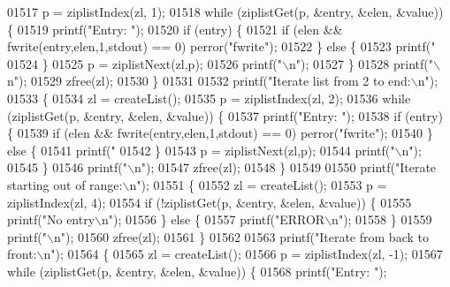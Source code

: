 \begin{DoxyCode}
{{{{{{{{{{{{{{{{{{{{{{{01517         p = ziplistIndex(zl, 1);
01518         \textcolor{keywordflow}{while} (ziplistGet(p, &entry, &elen, &value)) \{
01519             printf(\textcolor{stringliteral}{"Entry: "});
01520             \textcolor{keywordflow}{if} (entry) \{
01521                 \textcolor{keywordflow}{if} (elen && fwrite(entry,elen,1,stdout) == 0) perror(\textcolor{stringliteral}{"fwrite"});
01522             \} \textcolor{keywordflow}{else} \{
01523                 printf(\textcolor{stringliteral}{"%
01524             \}
01525             p = ziplistNext(zl,p);
01526             printf(\textcolor{stringliteral}{"\(\backslash\)n"});
01527         \}
01528         printf(\textcolor{stringliteral}{"\(\backslash\)n"});
01529         zfree(zl);
01530     \}
01531 
01532     printf(\textcolor{stringliteral}{"Iterate list from 2 to end:\(\backslash\)n"});
01533     \{
01534         zl = createList();
01535         p = ziplistIndex(zl, 2);
01536         \textcolor{keywordflow}{while} (ziplistGet(p, &entry, &elen, &value)) \{
01537             printf(\textcolor{stringliteral}{"Entry: "});
01538             \textcolor{keywordflow}{if} (entry) \{
01539                 \textcolor{keywordflow}{if} (elen && fwrite(entry,elen,1,stdout) == 0) perror(\textcolor{stringliteral}{"fwrite"});
01540             \} \textcolor{keywordflow}{else} \{
01541                 printf(\textcolor{stringliteral}{"%
01542             \}
01543             p = ziplistNext(zl,p);
01544             printf(\textcolor{stringliteral}{"\(\backslash\)n"});
01545         \}
01546         printf(\textcolor{stringliteral}{"\(\backslash\)n"});
01547         zfree(zl);
01548     \}
01549 
01550     printf(\textcolor{stringliteral}{"Iterate starting out of range:\(\backslash\)n"});
01551     \{
01552         zl = createList();
01553         p = ziplistIndex(zl, 4);
01554         \textcolor{keywordflow}{if} (!ziplistGet(p, &entry, &elen, &value)) \{
01555             printf(\textcolor{stringliteral}{"No entry\(\backslash\)n"});
01556         \} \textcolor{keywordflow}{else} \{
01557             printf(\textcolor{stringliteral}{"ERROR\(\backslash\)n"});
01558         \}
01559         printf(\textcolor{stringliteral}{"\(\backslash\)n"});
01560         zfree(zl);
01561     \}
01562 
01563     printf(\textcolor{stringliteral}{"Iterate from back to front:\(\backslash\)n"});
01564     \{
01565         zl = createList();
01566         p = ziplistIndex(zl, -1);
01567         \textcolor{keywordflow}{while} (ziplistGet(p, &entry, &elen, &value)) \{
01568             printf(\textcolor{stringliteral}{"Entry: "});
}}}}}}}}}}}}}}}}}}}}}}}}}
\end{DoxyCode}
